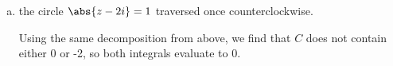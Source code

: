 \documentclass{article}
\begin{document}
\begin{itemize}
\begin{enumerate}[(a)]
			\item the circle $\abs{z-2i}=1$ traversed once counterclockwise.
				\begin{soln}
					Using the same decomposition from above, we find that $C$ does not contain either 0 or -2, so both integrals evaluate to 0.
				\end{soln}
				
		\end{enumerate}
		
\end{itemize}
\end{document}
